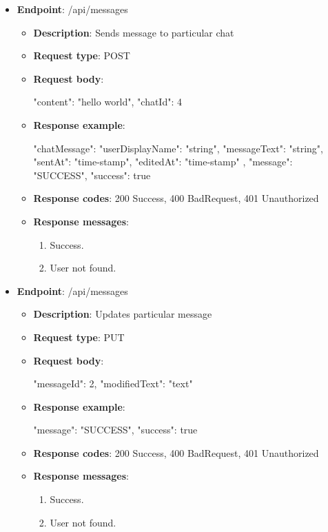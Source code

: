 \begin{itemize}
    \item \textbf{Endpoint}: /api/messages
    \begin{itemize}
        \item \textbf{Description}: Sends message to particular chat
        \item \textbf{Request type}: POST
        \item \textbf{Request body}:
        \begin{spverbatim}
        {
            "content": "hello world",
            "chatId": 4
        }
        \end{spverbatim}
        \item \textbf{Response example}:
        \begin{spverbatim}
        {
            "chatMessage": {
            "userDisplayName": "string",
            "messageText": "string",
            "sentAt": "time-stamp",
            "editedAt": "time-stamp"
            },
            "message": "SUCCESS",
            "success": true
        }
        \end{spverbatim}
        \item \textbf{Response codes}: 200 Success, 400 BadRequest, 401 Unauthorized
        \item \textbf{Response messages}:
        \begin{enumerate}
            \item Success.
            \item User not found.
        \end{enumerate}
    \end{itemize}

    \item \textbf{Endpoint}: /api/messages
    \begin{itemize}
        \item \textbf{Description}: Updates particular message
        \item \textbf{Request type}: PUT
        \item \textbf{Request body}:
        \begin{spverbatim}
        {
            "messageId": 2,
            "modifiedText": "text"
        }
        \end{spverbatim}
        \item \textbf{Response example}:
        \begin{spverbatim}
        {
            "message": "SUCCESS",
            "success": true
        }
        \end{spverbatim}
        \item \textbf{Response codes}: 200 Success, 400 BadRequest, 401 Unauthorized
        \item \textbf{Response messages}:
        \begin{enumerate}
            \item Success.
            \item User not found.
        \end{enumerate}
    \end{itemize}


\end{itemize}
